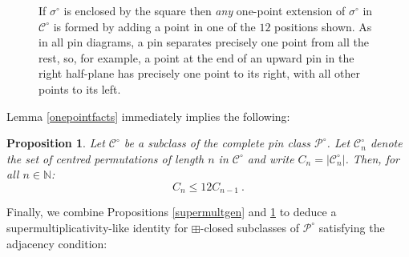\documentclass[11pt,a4paper]{article}
\newcommand{\plotptradius}{4pt}
\newtheorem{prop}[thm]{Proposition}
\theoremstyle{definition}
\begin{document}
\begin{figure}[h]
\begin{center}
\end{center}
\caption{If $\sigma^{\circ}$ is enclosed by the square then \emph{any} one-point extension of $\sigma^{\circ}$ in $\mathcal{C}^{\circ}$ is formed by adding a point in one of the $12$ positions shown. As in all pin diagrams, a pin separates precisely one point from all the rest, so, for example, a point at the end of an upward pin in the right half-plane has precisely one point to its right, with all other points to its left.}
\label{fig:extensionpossibilities}
\end{figure}

Lemma \ref{onepointfacts} immediately implies the following:

\begin{prop} \label{upratiobound}
Let $\mathcal{C}^{\circ}$ be a subclass of the complete pin class $\mathcal{P}^{\circ}$. Let $\mathcal{C}^{\circ}_{n}$ denote the set of centred permutations of length $n$ in $\mathcal{C}^{\circ}$ and write $C_{n} = |\mathcal{C}^{\circ}_{n}|$. Then, for all $n \in \mathbb{N}$:
\[
C_{n} \leq 12C_{n-1} \ .
\]
\end{prop}

Finally, we combine Propositions \ref{supermultgen} and \ref{upratiobound} to deduce a supermultiplicativity-like identity for $\boxplus$-closed subclasses of $\mathcal{P}^{\circ}$ satisfying the adjacency condition:
\end{document}
